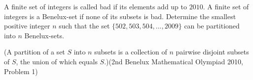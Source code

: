 A finite set of integers is called bad if its elements add up to $2010$. A finite set of integers is a Benelux-set if none of its subsets is bad. Determine the smallest positive integer $n$ such that the set $\{502, 503, 504, . . . , 2009\}$ can be partitioned into $n$ Benelux-sets.

(A partition of a set $S$ into $n$ subsets is a collection of $n$ pairwise disjoint subsets of $S$,  the union of which equals $S$.)(2nd Benelux Mathematical Olympiad 2010, Problem 1)